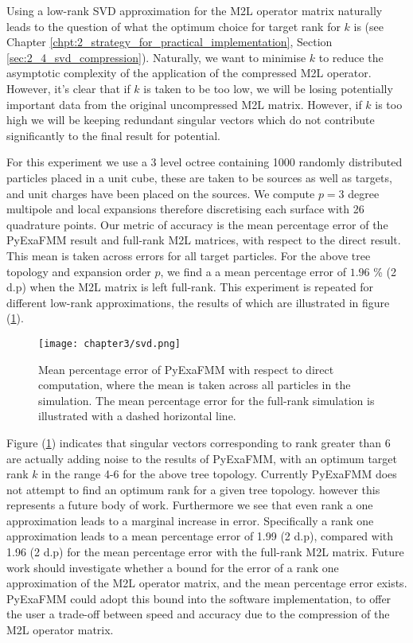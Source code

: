 Using a low-rank \gls{SVD} approximation for the \gls{M2L} operator matrix
naturally leads to the question of what the optimum choice for target rank for $k$
is (see Chapter \ref{chpt:2_strategy_for_practical_implementation}, Section \ref{sec:2_4_svd_compression}).
Naturally, we want to minimise $k$ to reduce the asymptotic complexity of
the application of the compressed \gls{M2L} operator. However, it's clear that
if $k$ is taken to be too low, we will be losing potentially important data
from the original uncompressed \gls{M2L} matrix. However, if $k$ is too high
we will be keeping redundant singular vectors which do not contribute significantly
to the final result for potential.

For this experiment we use a 3 level octree containing 1000 randomly distributed
particles placed in a unit cube, these are taken to be sources as well as targets, and
unit charges have been placed on the sources. We compute $p=3$ degree multipole and
local expansions therefore discretising each surface with 26 quadrature points.
Our metric of accuracy is the mean percentage error of the \gls{PyExaFMM} result and
full-rank \gls{M2L} matrices, with respect to the direct result.
This mean is taken across errors for all target particles. For the above
tree topology and expansion order $p$, we find a a mean percentage error of
$1.96$ \% (2 d.p) when the \gls{M2L} matrix is left full-rank.
This experiment is repeated for different low-rank approximations,
the results of which are illustrated in figure (\ref{fig:3_2_svd}).

\begin{figure}[ht]
    \centering

  {\texttt{[image: chapter3/svd.png]}}
  \vspace{0pt}
    \caption{Mean percentage error of \gls{PyExaFMM} with respect to direct
    computation, where the mean is taken across all particles in the simulation.
    The mean percentage error for the full-rank simulation is illustrated with
    a dashed horizontal line.
    }
    \label{fig:3_2_svd}
\end{figure}

Figure (\ref{fig:3_2_svd}) indicates that singular vectors corresponding to rank
greater than 6 are actually adding noise to the results of \gls{PyExaFMM}, with
an optimum target rank $k$ in the range 4-6 for the above tree topology. Currently
\gls{PyExaFMM} does not attempt to find an optimum rank for a given tree topology.
however this represents a future body of work. Furthermore we see that even rank a
one approximation leads to a marginal increase in error. Specifically a rank one
approximation leads to a mean percentage error of 1.99 (2 d.p), compared with
1.96 (2 d.p) for the mean percentage error with the full-rank \gls{M2L} matrix.
Future work should investigate whether a bound for the error of a
rank one approximation of the \gls{M2L} operator matrix, and the mean percentage
error exists. \gls{PyExaFMM} could adopt this bound into the software implementation,
to offer the user a trade-off between speed and accuracy due to the compression of
the \gls{M2L} operator matrix.

